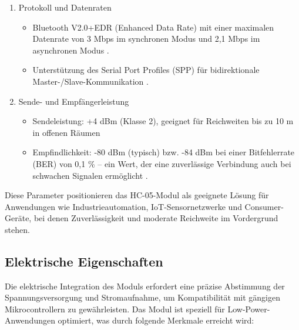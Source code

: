 \begin{enumerate}
    \item Protokoll und Datenraten
    \begin{itemize}
        \item Bluetooth V2.0+EDR (Enhanced Data Rate) mit einer maximalen Datenrate von 3 Mbps im synchronen Modus und 2,1 Mbps im asynchronen Modus \cite{ReicheltHC05:2025}\cite{HC05Datasheet:2010}.
        \item Unterstützung des Serial Port Profiles (SPP) für bidirektionale Master-/Slave-Kommunikation \cite{ReicheltHC05:2025}.
    \end{itemize}
    \item Sende- und Empfängerleistung 
    \begin{itemize} 
        \item Sendeleistung: +4 dBm (Klasse 2), geeignet für Reichweiten bis zu 10 m in offenen Räumen \cite{HC05Datasheet:2010}
        \item Empfindlichkeit: -80 dBm (typisch) bzw. -84 dBm bei einer Bitfehlerrate (BER) von 0,1 \% – ein Wert, der eine zuverlässige Verbindung auch bei schwachen Signalen ermöglicht \cite{HC05Datasheet:2010}\cite{ReicheltHC05:2025}.
    \end{itemize}
\end{enumerate}

Diese Parameter positionieren das HC-05-Modul als geeignete Lösung für Anwendungen wie Industrieautomation, IoT-Sensornetzwerke und Consumer-Geräte, bei denen Zuverlässigkeit und moderate Reichweite im Vordergrund stehen.



\subsection{Elektrische Eigenschaften}

Die elektrische Integration des Moduls erfordert eine präzise Abstimmung der Spannungsversorgung und Stromaufnahme, um Kompatibilität mit gängigen Mikrocontrollern zu gewährleisten. Das Modul ist speziell für Low-Power-Anwendungen optimiert, was durch folgende Merkmale erreicht wird:

